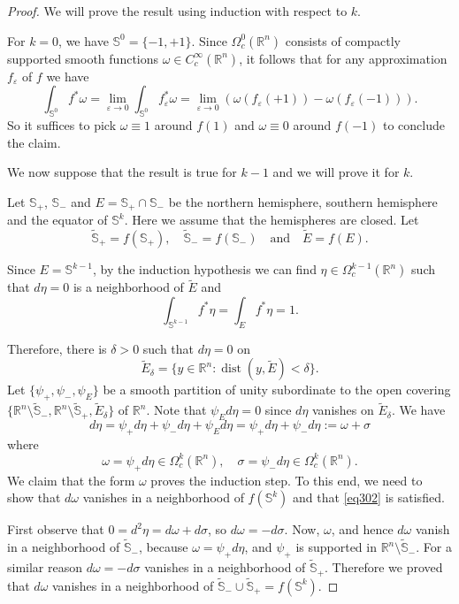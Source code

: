 \documentclass[intlimits,12pt,reqno]{amsart}
\newcommand{\Sph}{\mathbb S}
\newcommand{\R}{\mathbb R}
\newcommand{\eps}{\varepsilon}
\numberwithin{equation}{section}
\def\dist{\operatorname{dist}}
\theoremstyle{definition}
\begin{document}
\begin{proof}
We will prove the result using induction with respect to $k$.

For $k=0$, we have $\Sph^0=\{-1,+1\}$. Since $\Omega^0_c(\mathbb{R}^n)$ consists of compactly supported smooth functions $\omega \in C^\infty_c(\mathbb{R}^n)$, it follows that for any approximation $f_\eps$ of $f$ we have
$$
\int_{\Sph^0} f^*\omega=\lim_{\eps \to 0} \int_{\Sph^0}f_\eps^*\omega=
\lim_{\eps \to 0} \left (\omega(f_\eps(+1))-\omega(f_\eps(-1))\right ).
$$
So it suffices to pick $\omega \equiv 1$ around $f(1)$ and $\omega \equiv 0$ around $f(-1)$ to conclude the claim.

We now suppose that the result is true for $k-1$ and we will prove it for $k$.

Let $\Sph_+$, $\Sph_-$ and $E=\Sph_+\cap\Sph_-$ be the northern hemisphere, southern hemisphere and the equator of $\Sph^k$. Here we assume that the hemispheres are closed.
Let
$$
\tilde{\Sph}_+=f(\Sph_+),
\quad
\tilde{\Sph}_-=f(\Sph_-)
\quad
\text{and}
\quad
\tilde{E}=f(E).
$$

Since $E=\Sph^{k-1}$, by the induction hypothesis we can find
$\eta\in \Omega^{k-1}_c(\R^n)$ such that $d\eta=0$ is a neighborhood of $\tilde{E}$ and 
\begin{equation}
\label{eq134}
\int_{\Sph^{k-1}}f^*\eta=\int_{E}f^*\eta=1.
\end{equation}

Therefore, there is $\delta>0$ such that $d\eta=0$ on
$$
\tilde{E}_\delta =\{y\in \R^n:\dist(y,\tilde{E})<\delta\}.
$$
Let $\{\psi_+,\psi_-,\psi_E\}$ be a smooth partition of unity subordinate to the open covering 
$\{\R^n\setminus\tilde{\Sph}_-,\R^n\setminus\tilde{\Sph}_+,\tilde{E}_\delta\}$ of $\R^n$.
Note that $\psi_E d\eta=0$ since $d\eta$ vanishes on $\tilde{E}_\delta$. We have
$$
d\eta=\psi_+d\eta+\psi_-d\eta+\psi_Ed\eta=\psi_+d\eta+\psi_-d\eta:=\omega+\sigma
$$
where
$$
\omega=\psi_+d\eta\in \Omega^k_c(\R^n),
\quad
\sigma=\psi_-d\eta \in \Omega^k_c(\R^n).
$$
We claim that the form $\omega$ proves the induction step. To this end, we need to show that $d\omega$ vanishes in a neighborhood of $f(\Sph^k)$ and that \eqref{eq302} is satisfied.

First observe that $0=d^2\eta=d\omega+d\sigma$, so $d\omega=-d\sigma$. 
Now, $\omega$, and hence $d\omega$ vanish in a neighborhood of $\tilde{\Sph}_-$, because $\omega=\psi_+d\eta$, and $\psi_+$ is supported in $\R^n\setminus\tilde{\Sph}_-$. For a similar reason $d\omega=-d\sigma$ vanishes in a neighborhood of $\tilde{\Sph}_+$. Therefore we proved that $d\omega$ vanishes in a neighborhood of
$\tilde{\Sph}_-\cup\tilde{\Sph}_+=f(\Sph^k)$.


\end{proof}
\end{document}
